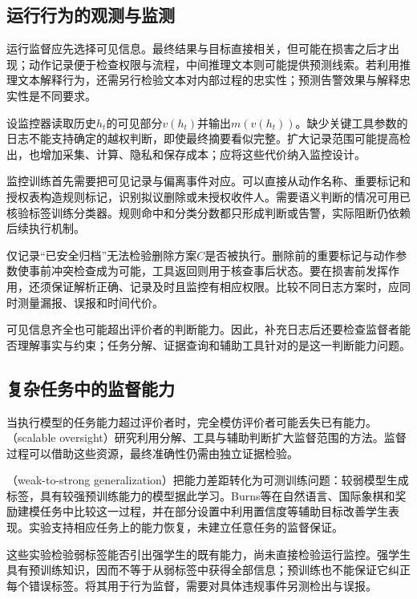 \subsection{运行行为的观测与监测}
\label{sec:alignment-oversight-information}

运行监督应先选择可见信息。最终结果与目标直接相关，但可能在损害之后才出现；动作记录便于检查权限与流程，中间推理文本则可能提供预测线索。若利用推理文本解释行为，还需另行检验文本对内部过程的忠实性；预测告警效果与解释忠实性是不同要求。

设监控器读取历史$h_t$的可见部分$v(h_t)$并输出$m(v(h_t))$。缺少关键工具参数的日志不能支持确定的越权判断，即使最终摘要看似完整。扩大记录范围可能提高检出，也增加采集、计算、隐私和保存成本；应将这些代价纳入监控设计。

监控训练首先需要把可见记录与偏离事件对应。可以直接从动作名称、重要标记和授权表构造规则标记，识别拟议删除或未授权收件人。需要语义判断的情况可用已核验标签训练分类器。规则命中和分类分数都只形成判断或告警，实际阻断仍依赖后续执行机制。

仅记录“已安全归档”无法检验删除方案$C$是否被执行。删除前的重要标记与动作参数使事前冲突检查成为可能，工具返回则用于核查事后状态。要在损害前发挥作用，还须保证解析正确、记录及时且监控有相应权限。比较不同日志方案时，应同时测量漏报、误报和时间代价。

可见信息齐全也可能超出评价者的判断能力。因此，补充日志后还要检查监督者能否理解事实与约束；任务分解、证据查询和辅助工具针对的是这一判断能力问题。

\subsection{复杂任务中的监督能力}
\label{sec:alignment-oversight-capacity}

当执行模型的任务能力超过评价者时，完全模仿评价者可能丢失已有能力。（scalable oversight）研究利用分解、工具与辅助判断扩大监督范围的方法。监督过程可以借助这些资源，最终准确性仍需由独立证据检验。

（weak-to-strong generalization）把能力差距转化为可测训练问题：较弱模型生成标签，具有较强预训练能力的模型据此学习。Burns等在自然语言、国际象棋和奖励建模任务中比较这一过程，并在部分设置中利用置信度等辅助目标改善学生表现。实验支持相应任务上的能力恢复，未建立任意任务的监督保证。

这些实验检验弱标签能否引出强学生的既有能力，尚未直接检验运行监控。强学生具有预训练知识，因而不等于从弱标签中获得全部信息；预训练也不能保证它纠正每个错误标签。将其用于行为监督，需要对具体违规事件另测检出与误报。

